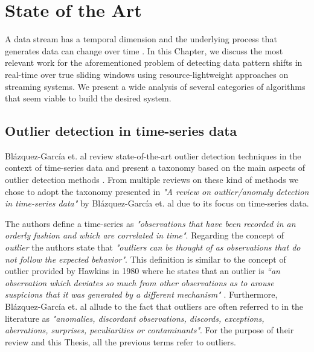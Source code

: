 \chapter{State of the Art} \label{chap:sota} \minitoc

A data stream has a temporal dimension and the underlying process that generates data can change over time \cite{Aggarwal-Evolving-Data-Streams} \cite{Domingos-Mining-Time-Data-Streams}. In this Chapter, we discuss the most relevant work for the aforementioned problem of detecting data pattern shifts in real-time over true sliding windows using resource-lightweight approaches on streaming systems. We present a wide analysis of several categories of algorithms that seem viable to build the desired system. 


\section{Outlier detection in time-series data}
Blázquez-García et. al review state-of-the-art outlier detection techniques in the context of time-series data and present a taxonomy based on the main aspects of outlier detection methods \cite{Blazquez-Garcia-Review-Anomaly-Detection}. From multiple reviews on these kind of methods \cite{Aggarwal-Outlier-survey} \cite{Aguinis-Outlier-survey} \cite{Chandola-Outlier-survey-2009} \cite{Hodge-Outlier-survey} \cite{Xu-outlier-survey-2019} we chose to adopt the taxonomy presented in \textit{"A review on outlier/anomaly detection in time-series data"} by Blázquez-García et. al due to its focus on time-series data.

The authors define a time-series as \textit{"observations that have been recorded in an orderly fashion and which are correlated in time"}. Regarding the concept of \textit{outlier} the authors state that \textit{"outliers can be thought of as observations that do not follow the expected behavior"}. This definition is similar to the concept of outlier provided by Hawkins in 1980 where he states that an outlier is \textit{“an observation which deviates so much from other observations as to arouse suspicions that it was
generated by a different mechanism"} \cite{Hawkins-Outliers}. Furthermore, Blázquez-García et. al allude to the fact that outliers are often referred to in the literature as \textit{"anomalies, discordant observations, discords, exceptions, aberrations, surprises, peculiarities or contaminants"}. For the purpose of their review and this Thesis, all the previous terms refer to outliers.


